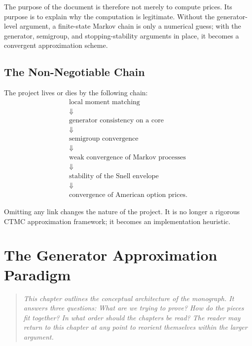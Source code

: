 \documentclass[11pt,a4paper,openany]{book}
\theoremstyle{definition}
\theoremstyle{plain}
\theoremstyle{remark}
\newcommand{\1}{\mathbbm{1}}
\begin{document}
\noindent The purpose of the document is therefore not merely to compute prices. Its purpose is to explain why the computation is legitimate. Without the generator-level argument, a finite-state Markov chain is only a numerical guess; with the generator, semigroup, and stopping-stability arguments in place, it becomes a convergent approximation scheme.

\section*{The Non-Negotiable Chain}

The project lives or dies by the following chain:
\[
\boxed{
\begin{array}{c}
\text{local moment matching} \\
\Downarrow \\
\text{generator consistency on a core} \\
\Downarrow \\
\text{semigroup convergence} \\
\Downarrow \\
\text{weak convergence of Markov processes} \\
\Downarrow \\
\text{stability of the Snell envelope} \\
\Downarrow \\
\text{convergence of American option prices.}
\end{array}}
\]

\noindent Omitting any link changes the nature of the project. It is no longer a rigorous CTMC approximation framework; it becomes an implementation heuristic.

\chapter*{The Generator Approximation Paradigm}

\begin{quote}
\itshape This chapter outlines the conceptual architecture of the monograph. It answers three questions: What are we trying to prove? How do the pieces fit together? In what order should the chapters be read? The reader may return to this chapter at any point to reorient themselves within the larger argument.
\end{quote}
\end{document}
